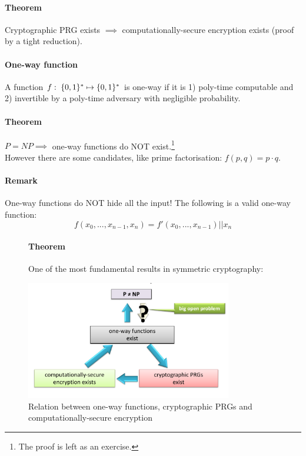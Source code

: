 \paragraph{Theorem} Cryptographic PRG exists $\implies$ computationally-secure encryption exists (proof by a tight reduction).

\paragraph{One-way function} A function $f:\; \lbrace 0, 1 \rbrace^* \mapsto \lbrace 0, 1 \rbrace^*$ is one-way if it is 1) poly-time computable and 2) invertible by a poly-time adversary with negligible probability.

\paragraph{Theorem} $P=NP \implies$ one-way functions do NOT exist.\footnote{The proof is left as an exercise.}\\
However there are some candidates, like prime factorisation: $f(p,q)=p\cdot q$.

\paragraph{Remark} One-way functions do NOT hide all the input! The following is a valid one-way function:
$$ f(x_0,...,x_{n-1}, x_n) = f'(x_0, ... , x_{n-1}) || x_n $$

\begin{figure}[h!]
    \paragraph{Theorem} One of the most fundamental results in symmetric cryptography: \\
    \begin{center}
        \includegraphics[width=9cm]{images/ch3-sc-one-way.png}
        \caption{Relation between one-way functions, cryptographic PRGs and computationally-secure encryption}
        \label{fig:sc-one-way}
    \end{center}
\end{figure}




